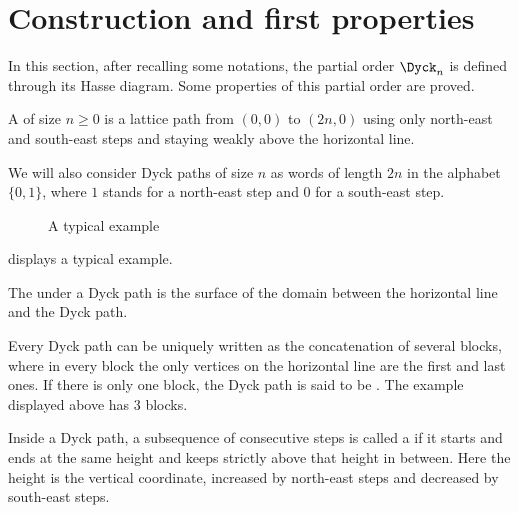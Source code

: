 \section{Construction and first properties}

In this section, after recalling some notations, the partial order
$\Dyck_n$ is defined through its Hasse diagram. Some properties of
this partial order are proved.

\label{sec1}
A  of size $n \geq 0$ is a lattice path from $(0,0)$ to
$(2 n,0)$ using only north-east and south-east steps and staying weakly above
the horizontal line.

We will also consider Dyck paths of size $n$ as words of length $2 n$
in the alphabet $\{0,1\}$, where $1$ stands for a north-east step and
$0$ for a south-east step.

\begin{figure}[htb]\centering
{}
\caption{A typical example}
\label{typique}
\end{figure}
 displays a typical example.

The  under a Dyck path is the surface of the domain between
the horizontal line and the Dyck path.

Every Dyck path can be uniquely written as the concatenation of
several blocks, where in every block the only vertices on the
horizontal line are the first and last ones. If there is only one
block, the Dyck path is said to be . The
example displayed above has $3$ blocks.

Inside a Dyck path, a subsequence of consecutive steps is called a
 if it starts and ends at the same height and keeps
strictly above that height in between. Here the height is the
vertical coordinate, increased by north-east steps and decreased by
south-east steps.

